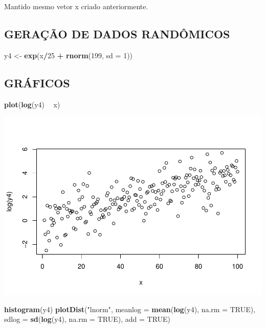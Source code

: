 \documentclass[]{article}
\newenvironment{Shaded}{\begin{snugshade}}{\end{snugshade}}
\newcommand{\KeywordTok}[1]{\textcolor[rgb]{0.13,0.29,0.53}{\textbf{#1}}}
\newcommand{\DataTypeTok}[1]{\textcolor[rgb]{0.13,0.29,0.53}{#1}}
\newcommand{\DecValTok}[1]{\textcolor[rgb]{0.00,0.00,0.81}{#1}}
\newcommand{\StringTok}[1]{\textcolor[rgb]{0.31,0.60,0.02}{#1}}
\newcommand{\OtherTok}[1]{\textcolor[rgb]{0.56,0.35,0.01}{#1}}
\newcommand{\OperatorTok}[1]{\textcolor[rgb]{0.81,0.36,0.00}{\textbf{#1}}}
\newcommand{\NormalTok}[1]{#1}
\begin{document}
Mantido mesmo vetor x criado anteriormente.

\subsection{GERAÇÃO DE DADOS
RANDÔMICOS}\label{geracao-de-dados-randomicos-4}

\begin{Shaded}
\begin{Highlighting}[]
\NormalTok{y4 <-}\StringTok{ }\KeywordTok{exp}\NormalTok{(x}\OperatorTok{/}\DecValTok{25} \OperatorTok{+}\StringTok{ }\KeywordTok{rnorm}\NormalTok{(}\DecValTok{199}\NormalTok{, }\DataTypeTok{sd =} \DecValTok{1}\NormalTok{)) }
\end{Highlighting}
\end{Shaded}

\subsection{GRÁFICOS}\label{graficos-4}

\begin{Shaded}
\begin{Highlighting}[]
\KeywordTok{plot}\NormalTok{(}\KeywordTok{log}\NormalTok{(y4) }\OperatorTok{~}\StringTok{ }\NormalTok{x)}
\end{Highlighting}
\end{Shaded}

\includegraphics{Impacto_sigma_files/figure-latex/unnamed-chunk-19-1.pdf}

\begin{Shaded}
\begin{Highlighting}[]
\KeywordTok{histogram}\NormalTok{(y4)}
\KeywordTok{plotDist}\NormalTok{(}\StringTok{"lnorm"}\NormalTok{, }
         \DataTypeTok{meanlog =} \KeywordTok{mean}\NormalTok{(}\KeywordTok{log}\NormalTok{(y4), }\DataTypeTok{na.rm =} \OtherTok{TRUE}\NormalTok{),}
         \DataTypeTok{sdlog =} \KeywordTok{sd}\NormalTok{(}\KeywordTok{log}\NormalTok{(y4), }\DataTypeTok{na.rm =} \OtherTok{TRUE}\NormalTok{), }
         \DataTypeTok{add =} \OtherTok{TRUE}\NormalTok{)}
\end{Highlighting}
\end{Shaded}
\end{document}

